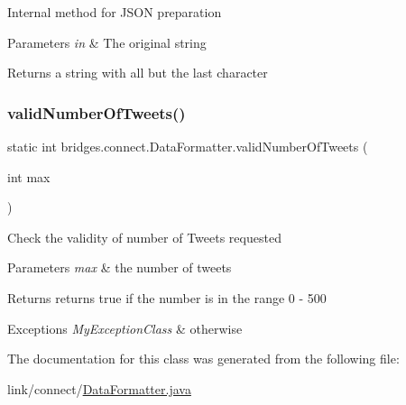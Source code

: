 Internal method for J\+S\+ON preparation 
\begin{DoxyParams}{Parameters}
{\em in} & The original string \\
\hline
\end{DoxyParams}
\begin{DoxyReturn}{Returns}
a string with all but the last character 
\end{DoxyReturn}
\hypertarget{classbridges_1_1connect_1_1_data_formatter_ad17084ac8b0f28837ebb1d77905cefb8}{}\label{classbridges_1_1connect_1_1_data_formatter_ad17084ac8b0f28837ebb1d77905cefb8} 
\subsubsection{\texorpdfstring{valid\+Number\+Of\+Tweets()}{validNumberOfTweets()}}
{\footnotesize\ttfamily static int bridges.\+connect.\+Data\+Formatter.\+valid\+Number\+Of\+Tweets (\begin{DoxyParamCaption}\item[{int}]{max }\end{DoxyParamCaption})\hspace{0.3cm}{\ttfamily [static]}}

Check the validity of number of Tweets requested 
\begin{DoxyParams}{Parameters}
{\em max} & the number of tweets \\
\hline
\end{DoxyParams}
\begin{DoxyReturn}{Returns}
returns true if the number is in the range 0 -\/ 500 
\end{DoxyReturn}

\begin{DoxyExceptions}{Exceptions}
{\em My\+Exception\+Class} & otherwise \\
\hline
\end{DoxyExceptions}


The documentation for this class was generated from the following file\+:\begin{DoxyCompactItemize}
\item 
link/connect/\hyperlink{_data_formatter_8java}{Data\+Formatter.\+java}\end{DoxyCompactItemize}
